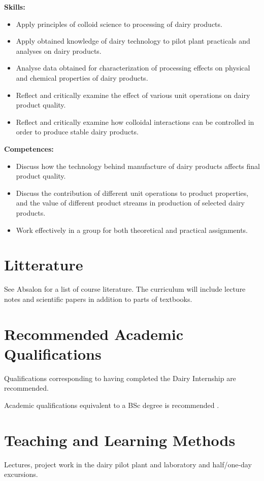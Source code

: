\textbf{Skills:}
\begin{itemize}
    \item Apply principles of colloid science to processing of dairy products.
    \item Apply obtained knowledge of dairy technology to pilot plant practicals and analyses on dairy products.
    \item Analyse data obtained for characterization of processing effects on physical and chemical properties of dairy products.
    \item Reflect and critically examine the effect of various unit operations on dairy product quality.
    \item Reflect and critically examine how colloidal interactions can be controlled in order to produce stable dairy products.
\end{itemize}
\vline

\textbf{Competences:}
\begin{itemize}
    \item Discuss how the technology behind manufacture of dairy products affects final product quality.
    \item Discuss the contribution of different unit operations to product properties, and the value of different product streams in production of selected dairy products.
    \item Work effectively in a group for both theoretical and practical assignments.
\end{itemize}

\section*{Litterature}
See Absalon for a list of course literature. The curriculum will include lecture notes and scientific papers in addition to parts of textbooks.

\section*{Recommended Academic Qualifications}
Qualifications corresponding to having completed the Dairy Internship are recommended.

Academic qualifications equivalent to a BSc degree is recommended .


\section*{Teaching and Learning Methods}
Lectures, project work in the dairy pilot plant and laboratory and half/one-day excursions.

